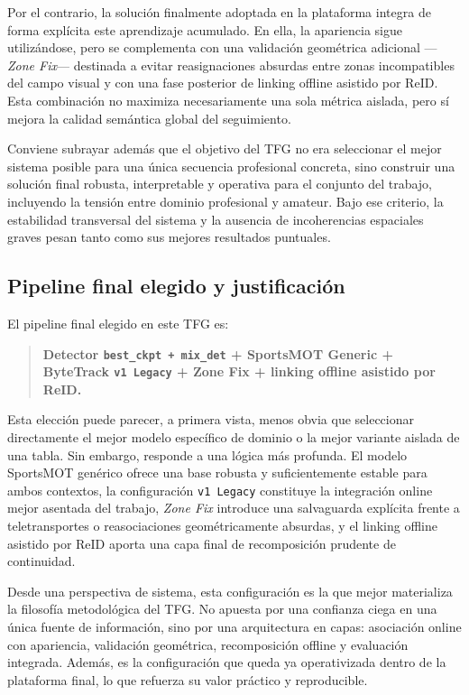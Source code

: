 \documentclass[../MAIN.tex]{subfiles}
\begin{document}
	Por el contrario, la solución finalmente adoptada en la plataforma integra de forma explícita este aprendizaje acumulado. En ella, la apariencia sigue utilizándose, pero se complementa con una validación geométrica adicional ---\textit{Zone Fix}--- destinada a evitar reasignaciones absurdas entre zonas incompatibles del campo visual y con una fase posterior de linking offline asistido por ReID. Esta combinación no maximiza necesariamente una sola métrica aislada, pero sí mejora la calidad semántica global del seguimiento.
	
	Conviene subrayar además que el objetivo del TFG no era seleccionar el mejor sistema posible para una única secuencia profesional concreta, sino construir una solución final robusta, interpretable y operativa para el conjunto del trabajo, incluyendo la tensión entre dominio profesional y amateur. Bajo ese criterio, la estabilidad transversal del sistema y la ausencia de incoherencias espaciales graves pesan tanto como sus mejores resultados puntuales.
	
	\subsection{Pipeline final elegido y justificación}
	
	El pipeline final elegido en este TFG es:
	
	\begin{quote}
		\textbf{Detector \texttt{best\_ckpt + mix\_det} + SportsMOT Generic + ByteTrack \texttt{v1 Legacy} + Zone Fix + linking offline asistido por ReID.}
	\end{quote}
	
	Esta elección puede parecer, a primera vista, menos obvia que seleccionar directamente el mejor modelo específico de dominio o la mejor variante aislada de una tabla. Sin embargo, responde a una lógica más profunda. El modelo SportsMOT genérico ofrece una base robusta y suficientemente estable para ambos contextos, la configuración \texttt{v1 Legacy} constituye la integración online mejor asentada del trabajo, \textit{Zone Fix} introduce una salvaguarda explícita frente a teletransportes o reasociaciones geométricamente absurdas, y el linking offline asistido por ReID aporta una capa final de recomposición prudente de continuidad.
	
	Desde una perspectiva de sistema, esta configuración es la que mejor materializa la filosofía metodológica del TFG. No apuesta por una confianza ciega en una única fuente de información, sino por una arquitectura en capas: asociación online con apariencia, validación geométrica, recomposición offline y evaluación integrada. Además, es la configuración que queda ya operativizada dentro de la plataforma final, lo que refuerza su valor práctico y reproducible.
	
\end{document}
